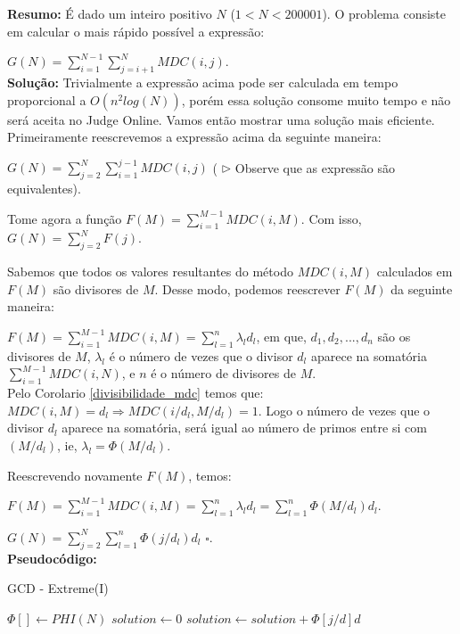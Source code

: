 \textbf{Resumo:}
É dado um inteiro positivo $N$ ($1 < N < 200001$). O problema consiste em calcular o mais rápido possível a expressão:

$G(N) = \sum_{i=1}^{N-1}\sum_{j=i+1}^{N}MDC(i,j)$.
\\

\textbf{Solução:}
Trivialmente a expressão acima pode ser calculada em tempo proporcional a $O(n^2log(N))$, porém essa solução consome muito tempo e não será aceita no Judge Online. Vamos então mostrar uma solução mais eficiente.
\\

Primeiramente reescrevemos a expressão acima da seguinte maneira:

$G(N) = \sum_{j=2}^N\sum_{i=1}^{j-1}MDC(i,j)$ ( $\rhd$ Observe que as expressão são equivalentes).

Tome agora a função $F(M) = \sum_{i=1}^{M-1}MDC(i, M)$. Com isso, $G(N) = \sum_{j=2}^NF(j)$.

Sabemos que todos os valores resultantes do método $MDC(i,M)$ calculados em $F(M)$ são divisores de $M$. Desse modo, podemos reescrever $F(M)$ da seguinte maneira:

$F(M) = \sum_{i=1}^{M-1}MDC(i, M) = \sum_{l=1}^{n}\lambda_l d_l$, em que, $d_1, d_2,..., d_n$ são os divisores de $M$, $\lambda_l$ é o número de vezes que o divisor $d_l$ aparece na somatória $\sum_{i=1}^{M-1}MDC(i,N)$, e $n$ é o número de divisores de $M$.
\\

Pelo Corolario \autoref{divisibilidade_mdc} temos que: $MDC(i,M) = d_l \Rightarrow MDC(i/d_l,M/d_l) = 1$. Logo o número de vezes que o divisor $d_l$ aparece na somatória, será igual ao número de primos entre si com $(M/d_l)$, ie, $\lambda_l = \Phi(M/d_l)$.

Reescrevendo novamente $F(M)$, temos:

$F(M) = \sum_{i=1}^{M-1}MDC(i, M) = \sum_{l=1}^n \lambda_l d_l = \sum_{l=1}^n \Phi(M/d_l) d_l$.

$G(N) = \sum_{j=2}^N \sum_{l=1}^n \Phi(j/d_l)d_l$ $\square$.
\\

\textbf{Pseudocódigo:}
\begin{algorithm}
\caption{GCD - Extreme(I)}\label{gcd_extreme}
\begin{algorithmic}[1]
\State $\Phi[] \gets PHI(N)$
\State $solution \gets 0$
\State $solution \gets solution + \Phi[j/d] d$
\EndFor
\EndFor
\State {}
\EndProcedure
\end{algorithmic}
\end{algorithm}


